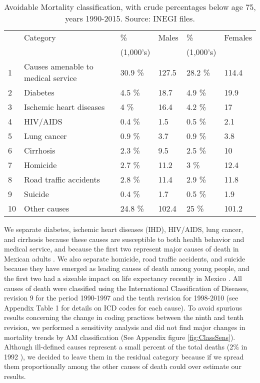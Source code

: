 \documentclass[11.5pt]{article}
\begin{document}
\begin{spacing}{1.5}
\begin{table}[ht]
\centering
\caption{Avoidable Mortality classification, 
             with crude percentages below age 75, years 1990-2015. Source: INEGI files.} 
\label{tab:causes}
\begin{tabular}{llllll}
  \hline
& Category &\% & Males &  \% & Females \\ 
 && (1,000's) & & (1,000's)\\ 
  \hline
1&  Causes amenable to medical service & 30.9 \% & 127.5 & 28.2 \% & 114.4 \\ 
2&  Diabetes & 4.5 \% & 18.7 & 4.9 \% & 19.9 \\ 
3&  Ischemic heart diseases & 4 \% & 16.4 & 4.2 \% & 17 \\ 
4&  HIV/AIDS & 0.4 \% & 1.5 & 0.5 \% & 2.1 \\ 
5&  Lung cancer & 0.9 \% & 3.7 & 0.9 \% & 3.8 \\ 
6&  Cirrhosis & 2.3 \% & 9.5 & 2.5 \% & 10 \\ 
7&  Homicide & 2.7 \% & 11.2 & 3 \% & 12.4 \\ 
8&  Road traffic accidents & 2.8 \% & 11.4 & 2.9 \% & 11.8 \\ 
9&  Suicide & 0.4 \% & 1.7 & 0.5 \% & 1.9 \\ 
10&  Other causes & 24.8 \% & 102.4 & 25 \% & 101.2 \\ 
   \hline
\end{tabular}
\end{table}

We separate diabetes, ischemic heart diseases (IHD), HIV/AIDS, lung
cancer, and cirrhosis because these causes are susceptible to both health behavior
and medical service, and because the first two represent major causes of death
in Mexican adults \citep{gomez2016dissonant}. We also separate
homicide, road traffic accidents, and suicide because they have emerged as
leading causes of death among young people, and the first two had a sizeable
impact on life expectancy recently in Mexico \citep{Aburto2015}. All causes of death were classified using the International Classification of Diseases, revision 9 for the period 1990-1997 and the tenth revision for 1998-2010 (see Appendix Table 1 for details on ICD codes for each cause). To avoid spurious results concerning the change in coding practices between the ninth and tenth revision, we performed a sensitivity analysis and did not find major changes in mortality trends by AM classification (See Appendix figure \ref{fig:ClassSens}). Although ill-defined causes represent a small percent of the total deaths (2\% in 1992 \citep{rivera2002epidemiological}), we decided to leave them in the residual category because if we spread them proportionally among the other causes of death could over estimate our results.


\end{spacing}
\end{document}
